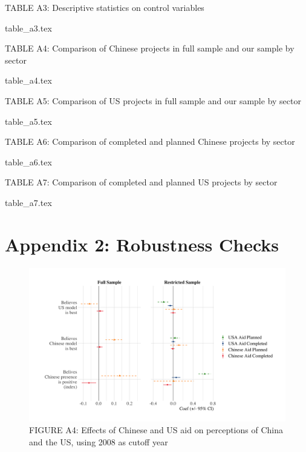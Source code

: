 \documentclass[9pt]{article}
\begin{document}
\setlength{\tabcolsep}{5pt}
\begin{table}[H]
\caption{TABLE A3: Descriptive statistics on control variables}
\label{reg}
\centering
{table_a3.tex}
\end{table}

\setlength{\tabcolsep}{5pt}
\begin{table}[H]
\caption{TABLE A4: Comparison of Chinese projects in full sample and our sample by sector}
\label{reg}
\centering
{table_a4.tex}
\end{table}

\setlength{\tabcolsep}{5pt}
\begin{table}[H]
\caption{TABLE A5: Comparison of US projects in full sample and our sample by sector}
\label{reg}
\centering
{table_a5.tex}
\end{table}

\setlength{\tabcolsep}{5pt}
\begin{table}[H]
\caption{TABLE A6: Comparison of completed and planned Chinese projects by sector}
\label{reg}
\centering
{table_a6.tex}
\end{table}

\setlength{\tabcolsep}{5pt}
\begin{table}[H]
\caption{TABLE A7: Comparison of completed and planned US projects by sector}
\label{reg}
\centering
{table_a7.tex}
\end{table}

\newpage
\section{Appendix 2: Robustness Checks}

\begin{figure}[H]
\centering
\includegraphics[width=1\textwidth]{figures/figure_a4.png}
\caption{FIGURE A4: Effects of Chinese and US aid on perceptions of China and the US, using 2008 as cutoff year}
\end{figure}
\end{document}
